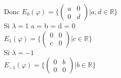 \documentclass{article}
\begin{document}
Donc \(E_0(\varphi) = \{\begin{pmatrix}
a & 0 \\ 0 & d
\end{pmatrix} | a,d \in \mathbb{R}\}\)\\
Si \(\lambda = 1\) a = b = d = 0 \\
\(E_1(\varphi) = \{\begin{pmatrix}
    0 & 0 \\ c & 0
\end{pmatrix} | c \in \mathbb{R}\}\)\\
Si \(\lambda = -1\) \\
\(E_{-1}(\varphi) = \{\begin{pmatrix}
    0 & b \\ 0 & 0
\end{pmatrix} | b \in \mathbb{R}\}\)\\
\end{document}
